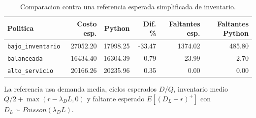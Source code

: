 \begin{table}[htbp]
\centering
\caption{Comparacion contra una referencia esperada simplificada de inventario.}
\label{tab:inventario-comparacion-esperada}
\begin{tabular}{lrrrrr}
\toprule
Politica & Costo esp. & Python & Dif. \% & Faltantes esp. & Faltantes Python \\
\midrule
\texttt{bajo\_inventario} & 27052.20 & 17998.25 & -33.47 & 1374.02 & 485.80 \\
\texttt{balanceada} & 16434.40 & 16304.39 & -0.79 & 23.99 & 2.70 \\
\texttt{alto\_servicio} & 20166.26 & 20235.96 & 0.35 & 0.00 & 0.00 \\
\bottomrule
\end{tabular}
\par\smallskip
\begin{minipage}{0.95\linewidth}
\centering\footnotesize
La referencia usa demanda media, ciclos esperados $D/Q$, inventario medio $Q/2+\max(r-\lambda_D L,0)$ y faltante esperado $E[(D_L-r)^+]$ con $D_L\sim Poisson(\lambda_D L)$.
\end{minipage}
\end{table}
